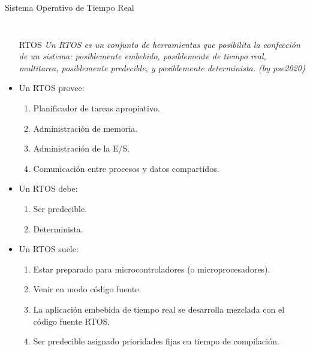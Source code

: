 \documentclass[8pt,aspectratio=169,compress]{beamer}
\begin{document}
\begin{frame}{Sistema Operativo de Tiempo Real}

   \begin{columns}[onlytextwidth,T]
     \column{\dimexpr\linewidth-50mm-5mm}

\begin{itemize}
  \item[RTOS] \textit{Un RTOS es un conjunto de herramientas que posibilita la confección de un sistema: posiblemente embebido, posiblemente de tiempo real, multitarea, posiblemente predecible, y posiblemente determinista. (by pse2020)}

\item Un RTOS provee:

\begin{enumerate}
\item Planificador de tareas apropiativo.

\item Administración de memoria.

\item Administración de la E/S.

\item Comunicación entre procesos y datos compartidos.
\end{enumerate}

\item Un RTOS debe:

\begin{enumerate}
\item Ser predecible.

\item Determinista.
\end{enumerate}


\item Un RTOS suele:

\begin{enumerate}
\item Estar preparado para microcontroladores (o microprocesadores).

\item Venir en modo código fuente.

\item La aplicación embebida de tiempo real se desarrolla mezclada con el código fuente RTOS.

\item Ser predecible asignado prioridades fijas en tiempo de compilación.
\end{enumerate}




\end{itemize}
\end{columns}
\end{frame}
\end{document}

